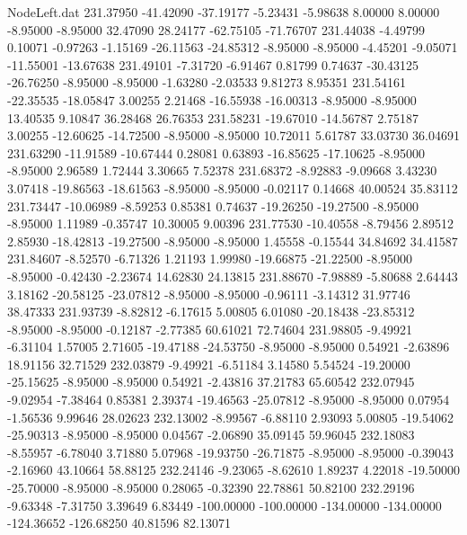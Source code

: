 \begin{filecontents}{NodeLeft.dat}
 231.37950  -41.42090  -37.19177    -5.23431   -5.98638    8.00000    8.00000   -8.95000   -8.95000   32.47090   28.24177  -62.75105  -71.76707
 231.44038   -4.49799    0.10071    -0.97263   -1.15169  -26.11563  -24.85312   -8.95000   -8.95000   -4.45201   -9.05071  -11.55001  -13.67638
 231.49101   -7.31720   -6.91467     0.81799    0.74637  -30.43125  -26.76250   -8.95000   -8.95000   -1.63280   -2.03533    9.81273    8.95351
 231.54161  -22.35535  -18.05847     3.00255    2.21468  -16.55938  -16.00313   -8.95000   -8.95000   13.40535    9.10847   36.28468   26.76353
 231.58231  -19.67010  -14.56787     2.75187    3.00255  -12.60625  -14.72500   -8.95000   -8.95000   10.72011    5.61787   33.03730   36.04691
 231.63290  -11.91589  -10.67444     0.28081    0.63893  -16.85625  -17.10625   -8.95000   -8.95000    2.96589    1.72444    3.30665    7.52378
 231.68372   -8.92883   -9.09668     3.43230    3.07418  -19.86563  -18.61563   -8.95000   -8.95000   -0.02117    0.14668   40.00524   35.83112
 231.73447  -10.06989   -8.59253     0.85381    0.74637  -19.26250  -19.27500   -8.95000   -8.95000    1.11989   -0.35747   10.30005    9.00396
 231.77530  -10.40558   -8.79456     2.89512    2.85930  -18.42813  -19.27500   -8.95000   -8.95000    1.45558   -0.15544   34.84692   34.41587
 231.84607   -8.52570   -6.71326     1.21193    1.99980  -19.66875  -21.22500   -8.95000   -8.95000   -0.42430   -2.23674   14.62830   24.13815
 231.88670   -7.98889   -5.80688     2.64443    3.18162  -20.58125  -23.07812   -8.95000   -8.95000   -0.96111   -3.14312   31.97746   38.47333
 231.93739   -8.82812   -6.17615     5.00805    6.01080  -20.18438  -23.85312   -8.95000   -8.95000   -0.12187   -2.77385   60.61021   72.74604
 231.98805   -9.49921   -6.31104     1.57005    2.71605  -19.47188  -24.53750   -8.95000   -8.95000    0.54921   -2.63896   18.91156   32.71529
 232.03879   -9.49921   -6.51184     3.14580    5.54524  -19.20000  -25.15625   -8.95000   -8.95000    0.54921   -2.43816   37.21783   65.60542
 232.07945   -9.02954   -7.38464     0.85381    2.39374  -19.46563  -25.07812   -8.95000   -8.95000    0.07954   -1.56536    9.99646   28.02623
 232.13002   -8.99567   -6.88110     2.93093    5.00805  -19.54062  -25.90313   -8.95000   -8.95000    0.04567   -2.06890   35.09145   59.96045
 232.18083   -8.55957   -6.78040     3.71880    5.07968  -19.93750  -26.71875   -8.95000   -8.95000   -0.39043   -2.16960   43.10664   58.88125
 232.24146   -9.23065   -8.62610     1.89237    4.22018  -19.50000  -25.70000   -8.95000   -8.95000    0.28065   -0.32390   22.78861   50.82100
 232.29196   -9.63348   -7.31750     3.39649    6.83449 -100.00000 -100.00000 -134.00000 -134.00000 -124.36652 -126.68250   40.81596   82.13071

\end{filecontents}
